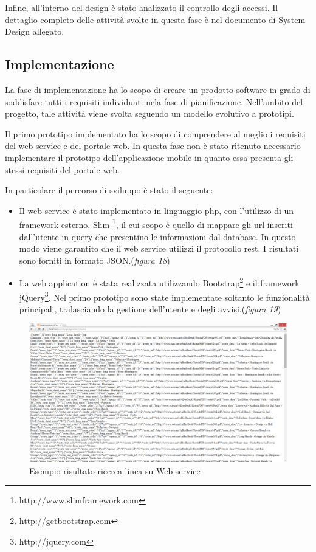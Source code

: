 Infine, all\rq interno del design \`{e} stato analizzato il controllo degli accessi. 
Il dettaglio completo delle attivit\`{a} svolte in questa fase \`{e} nel documento di System Design allegato.

\subsection{Implementazione}
La fase di implementazione ha lo scopo di creare un prodotto software in grado di soddisfare tutti i requisiti individuati nela fase di pianificazione. Nell'ambito del progetto, tale attivit\`{a} viene svolta seguendo un modello evolutivo a prototipi. 

Il primo prototipo implementato ha lo scopo di comprendere al meglio i requisiti del web service e del portale web. In questa fase non \`{e} stato ritenuto necessario implementare il prototipo dell\rq applicazione mobile in quanto essa presenta gli stessi requisiti del portale web. 

In particolare il percorso di sviluppo \`{e} stato il seguente:\\
\begin{itemize}
\item Il web service \`{e} stato implementato in linguaggio php, con l\rq utilizzo di un framework esterno, Slim \footnote{http://www.slimframework.com}, il cui scopo \`{e} quello di mappare gli url inseriti dall\rq utente in query che presentino le informazioni dal database. In questo modo viene garantito che il web service utilizzi il protocollo rest. I risultati sono forniti in formato JSON.(\emph{figura 18}) \\
\item La web application \`{e} stata realizzata utilizzando Bootstrap\footnote{http://getbootstrap.com} e il framework jQuery\footnote{http://jquery.com}. Nel primo prototipo sono state implementate soltanto le funzionalit\`{a} principali, tralasciando la gestione dell\rq utente e degli avvisi.(\emph{figura 19}) \\
\end{itemize}

\begin{figure}[tb]
\centering
\includegraphics[scale=.3]{img/19.png}
\caption{Esempio risultato ricerca linea su Web service }
\label{fig:mhs}
\end{figure} 

